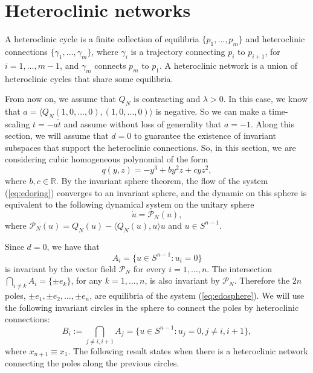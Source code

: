 \documentclass{article}
\theoremstyle{definition}
\begin{document}
\section{Heteroclinic networks}\label{sec:hetnetwork}

A heteroclinic cycle is a finite collection of equilibria $\{p_1,\dots,p_m\}$ and heteroclinic connections $\{\gamma_1,\dots,\gamma_{m}\}$, where $\gamma_i$ is a trajectory connecting $p_i$ to $p_{i+1}$, for $i=1,\dots,m-1$, and $\gamma_m$ connects $p_m$ to $p_1$. 
A heteroclinic network is a union of heteroclinic cycles that share some equilibria.

From now on, we assume that $Q_N$ is contracting and $\lambda>0$. 
In this case, we know that $a=\langle Q_N(1,0,\dots,0),(1,0,\dots,0)\rangle$ is negative. So we can make a time-scaling $t=-a\tilde{t}$ and assume without loss of generality that $a=-1$.
Along this section, we will assume that $d=0$ to guarantee the existence of invariant subspaces that support the heteroclinic connections. So, in this section, we are considering cubic homogeneous polynomial of the form $$q(y,z)=-y^3+b y^2 z + c y z^2,$$
where $b,c\in\mathbb{R}$.
By the invariant sphere theorem, the flow of the system (\ref{eq:edoring}) converges to an invariant sphere, and the dynamic on this sphere is equivalent to the following dynamical system on the unitary sphere 
\begin{equation}\label{eq:edosphere} 
\dot{u}=\mathcal{P}_N(u),
\end{equation}
where $\mathcal{P}_N(u)= Q_N(u)-\langle Q_N(u),u\rangle u$ and $u\in S^{n-1}$.

Since $d=0$, we have that $$A_i=\{u\in S^{n-1}: u_i=0\}$$ is invariant by the vector field $\mathcal{P}_N$ for every $i=1, \dots, n$.
The intersection $\bigcap_{i\neq k} A_i = \{ \pm e_k\}$, for any $k=1, \dots, n$, is also invariant by $\mathcal{P}_N$. Therefore the $2n$ poles, $\pm e_1, \pm e_2,\dots, \pm e_n$, are equilibria of the system (\ref{eq:edosphere}). 
We will use the following invariant circles in the sphere to connect the poles by heteroclinic connections:
$$B_i:=\bigcap_{j\neq i,i+1} A_j=\{u\in S^{n-1}: u_j=0, j\neq i,i+1\},$$
where $x_{n+1}\equiv x_1$. 
The following result states when there is a heteroclinic network connecting the poles along the previous circles.  
\end{document}
